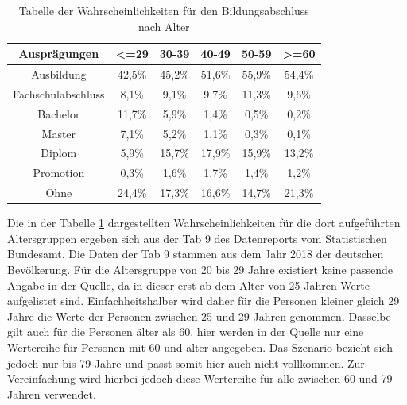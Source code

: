 \begin{onehalfspace}
\begin{table}[!h]
    \centering
    \begin{tabular}{|c|c|c|c|c|c|}
    \hline
    \textbf{Ausprägungen} & \textbf{\textless{}=29} & \textbf{30-39} & \textbf{40-49} & \textbf{50-59} & \textbf{\textgreater{}=60} \\ \hline
    Ausbildung            & 42,5\%                  & 45,2\%         & 51,6\%         & 55,9\%         & 54,4\%                     \\ \hline
    Fachschulabschluss    & 8,1\%                   & 9,1\%          & 9,7\%          & 11,3\%         & 9,6\%                      \\ \hline
    Bachelor              & 11,7\%                  & 5,9\%          & 1,4\%          & 0,5\%          & 0,2\%                      \\ \hline
    Master                & 7,1\%                   & 5,2\%          & 1,1\%          & 0,3\%          & 0,1\%                      \\ \hline
    Diplom                & 5,9\%                   & 15,7\%         & 17,9\%         & 15,9\%         & 13,2\%                     \\ \hline
    Promotion             & 0,3\%                   & 1,6\%          & 1,7\%          & 1,4\%          & 1,2\%                      \\ \hline
    Ohne                  & 24,4\%                  & 17,3\%         & 16,6\%         & 14,7\%         & 21,3\%                     \\ \hline
    \end{tabular}
    \caption{Tabelle der Wahrscheinlichkeiten für den Bildungsabschluss nach Alter}
    \label{table:8}
\end{table}
Die in der Tabelle \ref{table:8} dargestellten Wahrscheinlichkeiten für die dort aufgeführten Altersgruppen ergeben sich aus der \glqq{}Tab 9\grqq{} des Datenreports vom Statistischen Bundesamt. Die Daten der \glqq{}Tab 9\grqq{} stammen aus dem Jahr 2018 der deutschen Bevölkerung. Für die Altersgruppe von 20 bis 29 Jahre existiert keine passende Angabe in der Quelle, da in dieser erst ab dem Alter von 25 Jahren Werte aufgelistet sind. Einfachheitshalber wird daher für die Personen kleiner gleich 29 Jahre die Werte der Personen zwischen 25 und 29 Jahren genommen. Dasselbe gilt auch für die Personen älter als 60, hier werden in der Quelle nur eine Wertereihe für Personen mit 60 und älter angegeben. Das Szenario bezieht sich jedoch nur bis 79 Jahre und passt somit hier auch nicht vollkommen. Zur Vereinfachung wird hierbei jedoch diese Wertereihe für alle zwischen 60 und 79 Jahren verwendet.\cite{destatis2021}\\

\end{onehalfspace}
